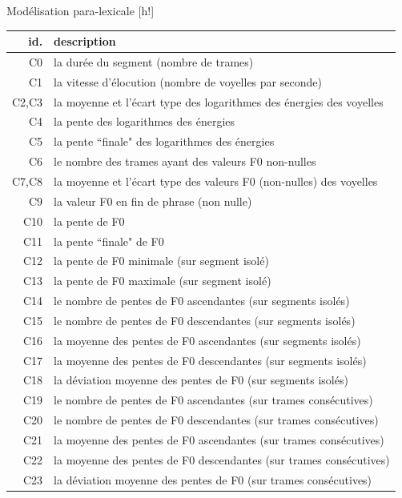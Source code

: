 \documentclass{style/these}
\makeatletter
\renewcommand\familydefault{ptm}
\renewenvironment{table}%
{ \renewcommand{\familydefault}{ptm}\selectfont
  \@float{table}}
  {\end@float}
\makeatother
\begin{document}
\begin{part}{Modélisation para-lexicale}
\begin{table}[h!]
\centering
\begin{tabular}{|r|l|}
\hline
id.	& description 									\\ \hline
C0	& la durée du segment (nombre de trames)					\\
C1	& la vitesse d'élocution (nombre de voyelles par seconde) 			\\ \hline
C2,C3	& la moyenne et l'écart type des logarithmes des énergies des voyelles  	\\ 
C4	& la pente des logarithmes des énergies  					\\
C5	& la pente ``finale" des logarithmes des énergies				\\ \hline
C6	& le nombre des trames ayant des valeurs F0 non-nulles	 			\\ 
C7,C8	& la moyenne et l'écart type des valeurs F0 (non-nulles) des voyelles 		\\
C9	& la valeur F0 en fin de phrase (non nulle) 					\\
C10	& la pente de F0 				 				\\ 
C11	& la pente ``finale" de F0 							\\ 
C12	& la pente de F0 minimale (sur segment isolé)					\\
C13	& la pente de F0 maximale (sur segment isolé)					\\ 
C14	& le nombre de pentes de F0 ascendantes (sur segments isolés)  			\\
C15	& le nombre de pentes de F0 descendantes (sur segments isolés)  		\\
C16	& la moyenne des pentes de F0 ascendantes (sur segments isolés) 		\\ 
C17	& la moyenne des pentes de F0 descendantes (sur segments isolés) 		\\ 
C18	& la déviation moyenne des pentes de F0 (sur segments isolés) 			\\ 
C19	& le nombre de pentes de F0 ascendantes (sur trames consécutives)	  	\\
C20	& le nombre de pentes de F0 descendantes (sur trames consécutives)  		\\
C21	& la moyenne des pentes de F0 ascendantes (sur trames consécutives) 		\\ 
C22	& la moyenne des pentes de F0 descendantes (sur trames consécutives) 		\\ 
C23	& la déviation moyenne des pentes de F0 (sur trames consécutives) 		\\ \hline
\end{tabular}
\caption{Les paramètres prosodiques calculés sur la phrase entière, sur les dernières 700ms du signal ou sur les dernières 200ms du signal}
\label{Tab:prosodParams2}
\end{table}


\end{part}
\end{document}
